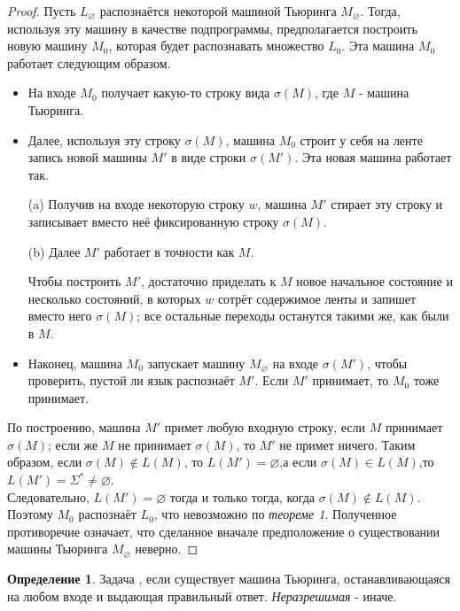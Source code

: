 \documentclass[a4paper]{article}
\theoremstyle{indented}
\theoremstyle{definition}
\newtheorem{defn}{Определение}
\theoremstyle{remark}
\begin{document}
\begin{proof}
    Пусть $L_\varnothing$ распознаётся некоторой машиной Тьюринга $M_\varnothing$. Тогда, используя эту машину в качестве подпрограммы, предполагается построить новую машину $M_0$, которая будет распознавать множество $L_0$. Эта машина $M_0$ работает следующим образом.

    \begin{itemize}
        \item На входе $M_0$ получает какую-то строку вида $\sigma(M)$, где $M$ - машина Тьюринга.
        \item Далее, используя эту строку $\sigma(M)$, машина $M_0$ строит у себя на ленте запись новой машины $M'$ в виде строки $\sigma(M')$. Эта новая машина работает так. \
        
            (a) Получив на входе некоторую строку $w$, машина $M'$ стирает эту строку и записывает вместо неё фиксированную строку $\sigma(M)$. \  

            (b) Далее $M'$ работает в точности как $M$. \ 

            Чтобы построить $M'$, достаточно приделать к $M$ новое начальное состояние и несколько состояний, в которых $w$ сотрёт содержимое ленты и запишет вместо него $\sigma(M)$; все остальные переходы останутся такими же, как были в $M$.
        \item Наконец, машина $M_0$ запускает машину $M_\varnothing$ на входе $\sigma(M')$, чтобы проверить, пустой ли язык распознаёт $M'$. Если $M'$ принимает, то $M_0$ тоже принимает.
    \end{itemize}

    По построению, машина $M'$ примет любую входную строку, если $M$ принимает $\sigma(M)$; если же $M$ не принимает $\sigma(M)$, то $M'$ не примет ничего. Таким образом, если $\sigma(M) \notin L(M)$, то $L(M')=\varnothing$,а если $\sigma(M)\in L(M)$,то $L(M')=\Sigma^*  \neq \varnothing$. \\ 

    Следовательно, $L(M') = \varnothing$ тогда и только тогда, когда $\sigma(M) \notin L(M)$. Поэтому $M_0$ распознаёт $L_0$, что невозможно по \textit{теореме 1}. Полученное противоречие означает, что сделанное вначале предположение о существовании машины Тьюринга $M_\varnothing$ неверно.
\end{proof}

\begin{defn}
    Задача , если существует машина Тьюринга, останавливающаяся на любом входе и выдающая правильный ответ. \textit{Неразрешимая} - иначе.
\end{defn}
\end{document}
